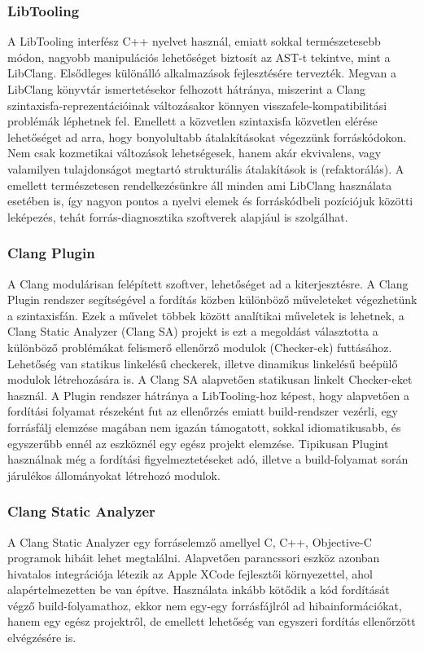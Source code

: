 \documentclass[a4paper,12pt]{report}
\begin{document}
\subsubsection{LibTooling}
A LibTooling interfész C++ nyelvet használ, emiatt sokkal természetesebb módon, nagyobb manipulációs lehetőséget biztosít az AST-t tekintve, mint a LibClang. Elsődleges különálló alkalmazások fejlesztésére tervezték. Megvan a LibClang könyvtár ismertetésekor felhozott hátránya, miszerint a Clang szintaxisfa-reprezentációinak változásakor könnyen visszafele-kompatibilitási problémák léphetnek fel. Emellett a közvetlen szintaxisfa közvetlen elérése lehetőséget ad arra, hogy bonyolultabb átalakításokat végezzünk forráskódokon. Nem csak kozmetikai változások lehetségesek, hanem akár ekvivalens, vagy valamilyen tulajdonságot megtartó strukturális átalakítások is (refaktorálás). A emellett természetesen rendelkezésünkre áll minden ami LibClang használata esetében is, így nagyon pontos a nyelvi elemek és forráskódbeli pozíciójuk közötti leképezés, tehát forrás-diagnosztika szoftverek alapjául is szolgálhat.

\subsubsection{Clang Plugin}
A Clang modulárisan felépített szoftver, lehetőséget ad a kiterjesztésre. A Clang Plugin rendszer segítségével a fordítás közben különböző műveleteket végezhetünk a szintaxisfán. Ezek a művelet többek között analítikai műveletek is lehetnek, a Clang Static Analyzer (Clang SA) projekt is ezt a megoldást választotta a különböző problémákat felismerő ellenőrző modulok (Checker-ek) futtásához. Lehetőség van statikus linkelésű checkerek, illetve dinamikus linkelésű beépülő modulok létrehozására is. A Clang SA alapvetően statikusan linkelt Checker-eket használ. A Plugin rendszer hátránya a LibTooling-hoz képest, hogy alapvetően a fordítási folyamat részeként fut az ellenőrzés emiatt build-rendszer vezérli, egy forrásfálj elemzése magában nem igazán támogatott, sokkal idiomatikusabb, és egyszerűbb ennél az eszköznél egy egész projekt elemzése. Tipikusan Plugint használnak még a fordítási figyelmeztetéseket adó, illetve a build-folyamat során járulékos állományokat létrehozó modulok.

\subsubsection{Clang Static Analyzer}
A Clang Static Analyzer egy forráselemző amellyel C, C++, Objective-C programok hibáit lehet megtalálni. Alapvetően parancssori eszköz azonban hivatalos integrációja létezik az Apple XCode fejlesztői környezettel, ahol alapértelmezetten be van építve. Használata inkább kötődik a kód fordítását végző build-folyamathoz, ekkor nem egy-egy forrásfájlról ad hibainformációkat, hanem egy egész projektről, de emellett lehetőség van egyszeri fordítás ellenőrzött elvégzésére is.
\end{document}
